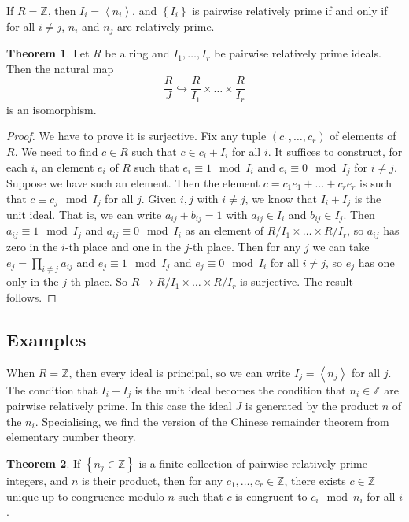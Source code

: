 \documentclass{article}
\newcommand{\Z}{\mathbb{Z}}
\newcommand{\rb}[1]{\left( #1 \right)}
\newcommand{\cb}[1]{\left\{ #1 \right\}}
\newcommand{\ab}[1]{\left\langle #1 \right\rangle}
\theoremstyle{definition}\newtheorem{definition}{Definition}[subsection]
\theoremstyle{definition}\newtheorem{remark}[definition]{Remark}
\theoremstyle{definition}\newtheorem*{example}{Example}
\theoremstyle{definition}\newtheorem*{note}{Note}
\newtheorem{theorem}[definition]{Theorem}
\begin{document}
If $ R = \Z $, then $ I_i = \ab{n_i} $, and $ \cb{I_i} $ is pairwise relatively prime if and only if for all $ i \ne j $, $ n_i $ and $ n_j $ are relatively prime.

\begin{theorem}
Let $ R $ be a ring and $ I_1, \dots, I_r $ be pairwise relatively prime ideals. Then the natural map
$$ \dfrac{R}{J} \hookrightarrow \dfrac{R}{I_1} \times \dots \times \dfrac{R}{I_r} $$
is an isomorphism.
\end{theorem}

\begin{proof}
We have to prove it is surjective. Fix any tuple $ \rb{c_1, \dots, c_r} $ of elements of $ R $. We need to find $ c \in R $ such that $ c \in c_i + I_i $ for all $ i $. It suffices to construct, for each $ i $, an element $ e_i $ of $ R $ such that $ e_i \equiv 1 \mod I_i $ and $ e_i \equiv 0 \mod I_j $ for $ i \ne j $. Suppose we have such an element. Then the element $ c = c_1e_1 + \dots + c_re_r $ is such that $ c \equiv c_j \mod I_j $ for all $ j $. Given $ i, j $ with $ i \ne j $, we know that $ I_i + I_j $ is the unit ideal. That is, we can write $ a_{ij} + b_{ij} = 1 $ with $ a_{ij} \in I_i $ and $ b_{ij} \in I_j $. Then $ a_{ij} \equiv 1 \mod I_j $ and $ a_{ij} \equiv 0 \mod I_i $ as an element of $ R / I_1 \times \dots \times R / I_r $, so $ a_{ij} $ has zero in the $ i $-th place and one in the $ j $-th place. Then for any $ j $ we can take $ e_j = \prod_{i \ne j} a_{ij} $ and $ e_j \equiv 1 \mod I_j $ and $ e_j \equiv 0 \mod I_i $ for all $ i \ne j $, so $ e_j $ has one only in the $ j $-th place. So $ R \to R / I_1 \times \dots \times R / I_r $ is surjective. The result follows.
\end{proof}

\subsection{Examples}

When $ R = \Z $, then every ideal is principal, so we can write $ I_j = \ab{n_j} $ for all $ j $. The condition that $ I_i + I_j $ is the unit ideal becomes the condition that $ n_i \in \Z $ are pairwise relatively prime. In this case the ideal $ J $ is generated by the product $ n $ of the $ n_i $. Specialising, we find the version of the Chinese remainder theorem from elementary number theory.

\begin{theorem}
If $ \cb{n_j \in \Z} $ is a finite collection of pairwise relatively prime integers, and $ n $ is their product, then for any $ c_1, \dots, c_r \in \Z $, there exists $ c \in \Z $ unique up to congruence modulo $ n $ such that $ c $ is congruent to $ c_i \mod n_i $ for all $ i $.
\end{theorem}
\end{document}

